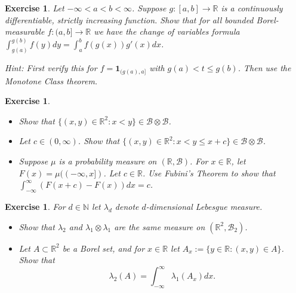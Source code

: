 \documentclass{article}
\newtheorem{exercise}[theorem]{Exercise}
\begin{document}
\begin{exercise}
Let $-\infty < a < b < \infty$. Suppose $g : [a, b] \to \mathbb{R}$ is a continuously differentiable, strictly increasing function. Show that for all bounded Borel-measurable $f : (a, b] \to \mathbb{R}$ we have the change of variables formula $\int_{g(a)}^{g(b)} f(y)dy = \int_{a}^{b} f(g(x))g'(x)dx$. 

\textit{Hint: First verify this for $f = \mathbf{1}_{(g(a),a]}$ with $g(a) < t \leq g(b)$. Then use the Monotone Class theorem.}
\end{exercise}
\bigskip

\begin{exercise}
\begin{itemize}
    \item[(a)] Show that $\{(x,y) \in \mathbb{R}^2 : x < y\} \in \mathcal{B} \otimes \mathcal{B}$.
    \item[(b)] Let $c \in (0,\infty)$. Show that $\{(x,y) \in \mathbb{R}^2 : x < y \leq x + c\} \in \mathcal{B} \otimes \mathcal{B}$.
    \item[(c)] Suppose $\mu$ is a probability measure on $(\mathbb{R}, \mathcal{B})$. For $x \in \mathbb{R}$, let $F(x) = \mu((-\infty, x])$. Let $c \in \mathbb{R}$. Use Fubini’s Theorem to show that $\int_{-\infty}^{\infty} (F(x+c) - F(x))dx = c$.
\end{itemize}
\end{exercise}

\begin{exercise}
For $d \in \mathbb{N}$ let $\lambda_d$ denote $d$-dimensional Lebesgue measure.
\begin{itemize}
    \item[(a)] Show that $\lambda_2$ and $\lambda_1 \otimes \lambda_1$ are the same measure on $(\mathbb{R}^2, \mathcal{B}_2)$.
    \item[(b)] Let $A \subset \mathbb{R}^2$ be a Borel set, and for $x \in \mathbb{R}$ let $A_x := \{y \in \mathbb{R} : (x, y) \in A\}$. Show that
    \[
    \lambda_2(A) = \int_{-\infty}^{\infty} \lambda_1(A_x)dx.
    \]
\end{itemize}
\end{exercise}
\end{document}
